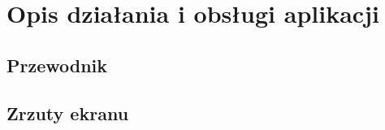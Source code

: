 \section{Opis działania i obsługi aplikacji}
    \subsection{Przewodnik}
    \subsection{Zrzuty ekranu}